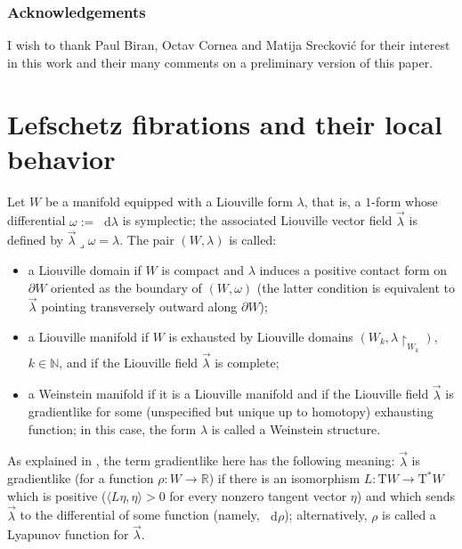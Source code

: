 \documentclass[JEP,XML,SOM,Unicode]{cedram}
\newcommand{\N}{{\mathbb N}}
\newcommand{\R}{{\mathbb R}}
\newcommand{\sT}{\mathrm{T}^\ast}
\newcommand{\rT}{\mathrm{T}}
\renewcommand{\d}{\mathop{}\!\mathrm d}
\newcommand{\dlambda}{\d\lambda}
\newcommand{\drho}{\d\rho}
\newcommand{\prg}[1]{\langle #1 \rangle}
\newcommand{\de}{\mathrel{:=}}
\newcommand{\rst}[1]{{\upharpoonright}_{\!#1}}
\newcommand{\hook}{\mathbin{\lrcorner}}
\let\del\partial
\let\on\colon
\theoremstyle{plain}
\theoremstyle{definition}
\begin{document}
\subsubsection*{Acknowledgements}

I wish to thank Paul Biran, Octav Cornea and Matija Sreckovi\'c for their
interest in this work and their many comments on a preliminary version of this
paper.

\section{Lefschetz fibrations and their local behavior} \label{s:slf}

Let $W$ be a manifold equipped with a Liouville form $\lambda$, that is, a
$1$-form whose differential $\omega \de \dlambda$ is symplectic; the associated
Liouville vector field $\vec\lambda$ is defined by $\vec\lambda \hook \omega =
\lambda$. The pair $(W,\lambda)$ is called:
\begin{itemize}
\item
a Liouville domain if $W$ is compact and $\lambda$ induces a positive contact
form on $\del W$ oriented as the boundary of $(W,\omega)$ (the latter condition
is equivalent to $\vec\lambda$ pointing transversely outward along $\del W$);
\item
a Liouville manifold if $W$ is exhausted by Liouville domains $(W_k, \lambda
\rst{ W_k })$, $k \in \N$, and if the Liouville field $\vec\lambda$ is complete;
\item
a Weinstein manifold if it is a Liouville manifold and if the Liouville field
$\vec\lambda$ is gradientlike for some (unspecified but unique up to homotopy)
exhausting function; in this case, the form $\lambda$ is called a Weinstein
structure.
\end{itemize}
As explained in \cite{Ci}, the term gradientlike here has the following meaning:
$\vec\lambda$ is gradientlike (for a function $\rho \on W \to \R$) if there is
an isomorphism $L \on \rT W \to \sT W$ which is positive ($\prg{ L\eta, \eta }
> 0$ for every nonzero tangent vector $\eta$) and which sends $\vec\lambda$ to
the differential of some function (namely, $\drho$); alternatively, $\rho$ is
called a Lyapunov function for $\vec\lambda$.
\end{document}
